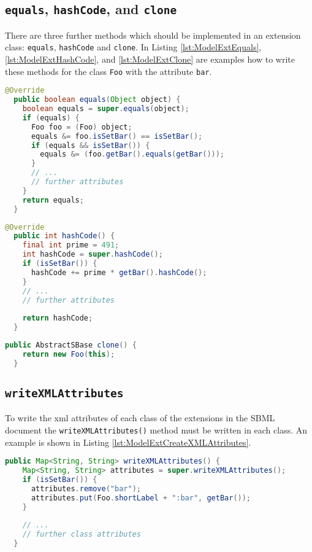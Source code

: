 \subsection{\texttt{equals}, \texttt{hashCode}, and \texttt{clone}}
There are three further methods which should be implemented in an extension class: \texttt{equals}, \texttt{hashCode} and \texttt{clone}.
In Listing \ref{lst:ModelExtEquals}, \ref{lst:ModelExtHashCode}, and \ref{lst:ModelExtClone} are examples how to write these methods for the class \texttt{Foo} with the attribute \texttt{bar}.

\begin{lstlisting}[language=Java,caption={Example of the \texttt{equals} method},label={lst:ModelExtEquals}]
@Override
  public boolean equals(Object object) {
    boolean equals = super.equals(object);
    if (equals) {
      Foo foo = (Foo) object;
      equals &= foo.isSetBar() == isSetBar();
      if (equals && isSetBar()) {
        equals &= (foo.getBar().equals(getBar()));
      }
      // ...
      // further attributes
    }
    return equals;
  }
\end{lstlisting}


\begin{lstlisting}[language=Java,caption={Example of the \texttt{hashCode} method. The variable \texttt{prime} should be a big prime number to prevent collisions},label={lst:ModelExtHashCode}]
  @Override
  public int hashCode() {
    final int prime = 491;
    int hashCode = super.hashCode();
    if (isSetBar()) {
      hashCode += prime * getBar().hashCode();
    }
    // ...
    // further attributes
    
    return hashCode;
  }
\end{lstlisting}

\begin{lstlisting}[language=Java,caption={Example of the \texttt{clone} method},label={lst:ModelExtClone}]
  public AbstractSBase clone() {
    return new Foo(this);
  }
\end{lstlisting}


\subsection{\texttt{writeXMLAttributes}}
To write the xml attributes of each class of the extensions in the SBML document the \texttt{writeXMLAttributes()} method must be written in each class.
An example is shown in Listing \ref{lst:ModelExtCreateXMLAttributes}.

\begin{lstlisting}[language=Java,caption={Method to create the XML attributes},label={lst:ModelExtCreateXMLAttributes}]
  public Map<String, String> writeXMLAttributes() {
    Map<String, String> attributes = super.writeXMLAttributes();
    if (isSetBar()) {
      attributes.remove("bar");
      attributes.put(Foo.shortLabel + ":bar", getBar());
    }
    
    // ...
    // further class attributes
  }
\end{lstlisting}



